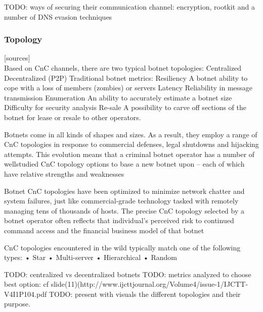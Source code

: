 TODO: ways of securing their communication channel: encryption, rootkit and a number of DNS evasion techniques

\subsubsection{Topology}

[sources]\\


Based on CnC channels, there are two typical botnet topologies:
Centralized
Decentralized (P2P)
     Traditional botnet metrics:
Resiliency
A botnet ability to cope with a loss of members (zombies) or servers
Latency
Reliability in message transmission
Enumeration
An ability to accurately estimate a botnet size
Difficulty for security analysis
Re-sale
A possibility to carve off sections of the botnet for lease or resale to
other operators. 

Botnets come in all kinds of shapes and sizes. As a result, they employ a range of CnC
topologies in response to commercial defenses, legal shutdowns and hijacking
attempts. This evolution means that a criminal botnet operator has a number of wellstudied
CnC topology options to base a new botnet upon – each of which have
relative strengths and weaknesses

Botnet CnC topologies have been optimized to minimize network chatter and system
failures, just like commercial-grade technology tasked with remotely managing tens of
thousands of hosts. The precise CnC topology selected by a botnet operator often
reflects that individual’s perceived risk to continued command access and the financial
business model of that botnet

CnC topologies encountered in the wild typically match one of the following types:
• Star
• Multi-server
• Hierarchical
• Random

TODO: centralized vs decentralized botnets
TODO: metrics analyzed to choose best option: cf slide(11)(http://www.ijcttjournal.org/Volume4/issue-1/IJCTT-V4I1P104.pdf
TODO: present with visuals the different topologies and their purpose.

